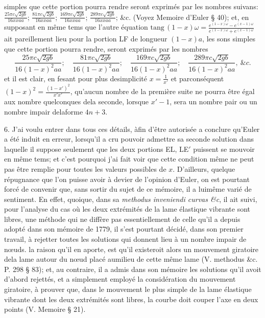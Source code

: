 \documentclass[11pt,a4paper]{article}
\begin{document}
simples que cette portion pourra rendre seront exprimés par les nombres
suivans: $\frac{25\pi c\sqrt{2gb}}{16xxaa}$; $\frac{81\pi c\sqrt{2gb}}{16xxaa}$; $\frac{169\pi c\sqrt{2gb}}{16xxaa}$; $\frac{289\pi c\sqrt{2gb}}{16xxaa}$; \&c. (Voyez Memoire d'Euler § 40);
et, en supposant en même tems que l'autre équation $\text{tang}\,(1-x)\omega = \frac{e^{(1-x)\omega} - e^{(x-1)\omega}}{e^{(1-x)\omega} + e^{(x-1)\omega}}$
ait pareillement lieu pour la portion LF de longueur $(1-x)a$, les sons simples
que cette portion pourra rendre, seront exprimés par les nombres
\[ \frac{25\pi c\sqrt{2gb}}{16(1-x)^2 aa};\quad \frac{81\pi c\sqrt{2gb}}{16(1-x)^2 aa};\quad \frac{169\pi c\sqrt{2gb}}{16(1-x)^2 aa};\quad \frac{289\pi c\sqrt{2gb}}{16(1-x)^2 aa},\ \&c. \]
et il est clair, en fesant pour plus desimplicité $x = \frac{1}{x'}$ et parconséquent $(1-x)^2 = \frac{(1-x')^2}{x'x'}$,
qu'aucun nombre de la première suite ne pourra être égal aux nombre quelconques
dela seconde, lorsque $x'-1$, sera un nombre pair ou un nombre impair delaforme $4n+3$.


6. J'ai voulu entrer dans tous ces détails, àfin d'être autorisée a conclure qu'Euler
a été induit en erreur, lorsqu'il a cru pouvoir admettre sa seconde solution
dans laquelle il suppose seulement que les deux portions EL, LE$'$ puissent se mouvoir
en même tems; et c'est pourquoi j'ai fait voir que cette condition même ne peut
pas être remplie pour toutes les valeurs possibles de $x$. D'ailleurs, quelque
répugnance que l'on puisse avoir à devier de l'opinion d'Euler, on est pourtant
forcé de convenir que, sans sortir du sujet de ce mémoire, il a luimême varié
de sentiment. En effet, quoique, dans sa \emph{methodus inveniendi curvas \&c},
il ait suivi, pour l'analyse du cas où les deux extrémités de la lame élastique
vibrante sont libres, une méthode qui ne diffère pas essentiellement de celle qu'il
a depuis adopté dans son mémoire de 1779, il s'est pourtant décidé, dans son
premier travail, à rejetter toutes les solutions qui donnent lieu à un nombre
impair de nœuds. la raison qu'il en aporte, est qu'il existeroit alors un
mouvement giratoire dela lame autour du nœud placé aumilieu de cette même lame
(V. methodus \&c. P. 298 § 83); et, au contraire, il a admis dans son mémoire les solutions qu'il
avoit d'abord rejettés, et a simplement employé la considération du mouvement
giratoire, à prouver que, dans le mouvement le plus simple de la lame élastique
vibrante dont les deux extrémités sont libres, la courbe doit couper l'axe en deux
points (V. Memoire § 21).
\end{document}
